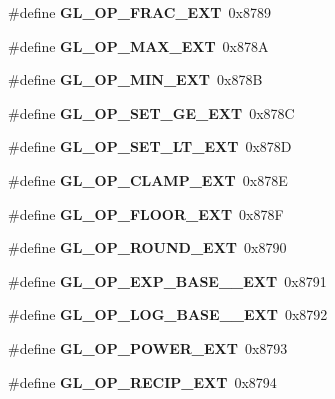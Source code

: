 \begin{DoxyCompactItemize}
\item 
\#define {\bfseries G\+L\+\_\+\+O\+P\+\_\+\+F\+R\+A\+C\+\_\+\+E\+X\+T}~0x8789\label{_s_d_l__opengl_8h_acbbf9d859c18093a38931c6d51fc6142}

\item 
\#define {\bfseries G\+L\+\_\+\+O\+P\+\_\+\+M\+A\+X\+\_\+\+E\+X\+T}~0x878\+A\label{_s_d_l__opengl_8h_a89c3062e684f04c8e5799c5654432881}

\item 
\#define {\bfseries G\+L\+\_\+\+O\+P\+\_\+\+M\+I\+N\+\_\+\+E\+X\+T}~0x878\+B\label{_s_d_l__opengl_8h_ae7ee6ae455345576ac1e087352057c34}

\item 
\#define {\bfseries G\+L\+\_\+\+O\+P\+\_\+\+S\+E\+T\+\_\+\+G\+E\+\_\+\+E\+X\+T}~0x878\+C\label{_s_d_l__opengl_8h_a38c73002685e191984d556a63b597425}

\item 
\#define {\bfseries G\+L\+\_\+\+O\+P\+\_\+\+S\+E\+T\+\_\+\+L\+T\+\_\+\+E\+X\+T}~0x878\+D\label{_s_d_l__opengl_8h_a5d4674ce2e6e61d7c6ae1c3cccc6ed0e}

\item 
\#define {\bfseries G\+L\+\_\+\+O\+P\+\_\+\+C\+L\+A\+M\+P\+\_\+\+E\+X\+T}~0x878\+E\label{_s_d_l__opengl_8h_aba09d709f0a7b5f82065ebf77ade1b3e}

\item 
\#define {\bfseries G\+L\+\_\+\+O\+P\+\_\+\+F\+L\+O\+O\+R\+\_\+\+E\+X\+T}~0x878\+F\label{_s_d_l__opengl_8h_ab55d2b3e595e82297991a5d556994ec1}

\item 
\#define {\bfseries G\+L\+\_\+\+O\+P\+\_\+\+R\+O\+U\+N\+D\+\_\+\+E\+X\+T}~0x8790\label{_s_d_l__opengl_8h_a139440e359f8928838f772c00a22874b}

\item 
\#define {\bfseries G\+L\+\_\+\+O\+P\+\_\+\+E\+X\+P\+\_\+\+B\+A\+S\+E\+\_\+\_\+\+E\+X\+T}~0x8791\label{_s_d_l__opengl_8h_a051ab645a105c87ef94733bea72a8719}

\item 
\#define {\bfseries G\+L\+\_\+\+O\+P\+\_\+\+L\+O\+G\+\_\+\+B\+A\+S\+E\+\_\+\_\+\+E\+X\+T}~0x8792\label{_s_d_l__opengl_8h_a4d3cbad14eabbd008f372198dde9f34b}

\item 
\#define {\bfseries G\+L\+\_\+\+O\+P\+\_\+\+P\+O\+W\+E\+R\+\_\+\+E\+X\+T}~0x8793\label{_s_d_l__opengl_8h_a5e41c6993fe09779d4c49251f6adf2eb}

\item 
\#define {\bfseries G\+L\+\_\+\+O\+P\+\_\+\+R\+E\+C\+I\+P\+\_\+\+E\+X\+T}~0x8794\label{_s_d_l__opengl_8h_aadd6e35479ae74aa5f158ff72df46819}


\end{DoxyCompactItemize}
